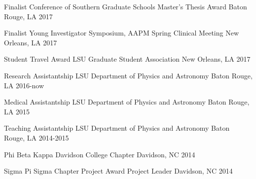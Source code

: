 



\begin{cvhonors}

  \cvhonor
    {Finalist} %
    {Conference of Southern Graduate Schools Master's Thesis Award} %
    {Baton Rouge, LA} %
    {2017} %

  \cvhonor
    {Finalist} %
    {Young Investigator Symposium, AAPM Spring Clinical Meeting} %
    {New Orleans, LA} %
    {2017} %

  \cvhonor
    {Student Travel Award} %
    {LSU Graduate Student Association} %
    {New Orleans, LA} %
    {2017} %

  \cvhonor
    {Research Assistantship} %
    {LSU Department of Physics and Astronomy} %
    {Baton Rouge, LA} %
    {2016-now} %

  \cvhonor
    {Medical Assistantship} %
    {LSU Department of Physics and Astronomy} %
    {Baton Rouge, LA} %
    {2015} %

  \cvhonor
    {Teaching Assistantship} %
    {LSU Department of Physics and Astronomy} %
    {Baton Rouge, LA} %
    {2014-2015} %

  \cvhonor
    {Phi Beta Kappa} %
    {Davidson College Chapter} %
    {Davidson, NC} %
    {2014} %

  \cvhonor
    {Sigma Pi Sigma Chapter Project Award} %
    {Project Leader} %
    {Davidson, NC} %
    {2014} %


\end{cvhonors}
